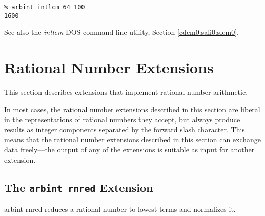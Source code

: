 \begin{tclcommandsampleinvocations}
\begin{scriptsize}
\begin{verbatim}
% arbint intlcm 64 100
1600
\end{verbatim}
\end{scriptsize}
\end{tclcommandsampleinvocations}

\begin{tclcommandseealso}
See also the \emph{intlcm} DOS command-line utility, 
Section \ref{cdcm0:sali0:slcm0}.
\end{tclcommandseealso}


\section{Rational Number Extensions}

This section describes extensions that implement
rational number arithmetic.

In most cases, the rational number extensions described in
this section are liberal in the representations of rational numbers
they accept, but always produce results as integer components
separated by the forward slash character.  This means that the
rational number extensions described in this section can exchange data
freely---the output of any of the extensions is suitable as input
for another extension.


\subsection{The \texttt{arbint rnred} Extension}
\label{cxtn0:srne0:srnr0}

\begin{tclcommandname}{arbint rnred}%
reduces a rational number to lowest terms and normalizes it.
\end{tclcommandname}

